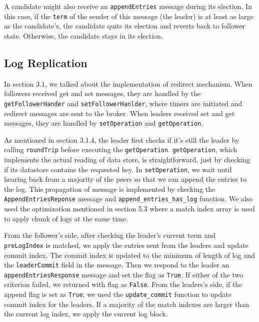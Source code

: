 \documentclass[11pt]{article}
\begin{document}
A candidate might also receive an \texttt{appendEntries} message during its election. In this case, if the \texttt{term} of the sender of this message (the leader) is at least as large as the candidate's, the candidate quits its election and reverts back to follower state. Otherwise, the candidate stays in its election.



\subsection{Log Replication}

In section 3.1, we talked about the implementation of redirect mechanism. When followers received get and set messages, they are handled by the \texttt{getFollowerHander} and \texttt{setFollowerHanlder}, where timers are initiated and redirect messages are sent to the broker. When leaders received set and get messages, they are handled by \texttt{setOperation} and \texttt{getOperation}. 

As mentioned in section 3.1.4, the leader first checks if it's still the leader by calling \texttt{roundTrip} before executing the \texttt{getOperation}. \texttt{getOperation}, which implements the actual reading of data store, is straightforward, just by checking if its datastore contains the requested key. In \texttt{setOperation}, we  wait until hearing back from a majority of the peers so that we can append the entries to the log. This propagation of message is implemented by checking the \texttt{AppendEntriesReponse} message and \texttt{append\_entries\_has\_log} function. We also used the optimization mentioned in section 5.3 \cite{Raft} where a match index array is used to apply chunk of logs at the same time. 

From the follower’s side, after checking the leader’s current term and \texttt{preLogIndex} is matched, we apply the entries sent from the leaders and update commit index. The commit index is updated to the minimum of length of log and the \texttt{leaderCommit} field in the message. Then we respond to the leader an \texttt{appendEntriesResponse} message and set the flag as \texttt{True}. If either of the two criterion failed, we returned with flag as \texttt{False}. From the leaders’s side, if the append flag is set as \texttt{True}, we used the \texttt{update\_commit} function to update commit index for the leaders. If a majority of the match indexes are larger than the current log index, we apply the current log block. 
\end{document}
